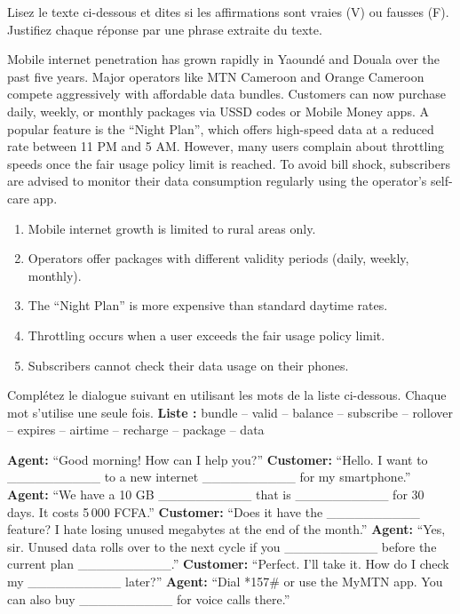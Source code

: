 \documentclass[11pt]{article}
\newcommand{\cle}[1]{{\popxbold\color{popdark}#1}}
\begin{document}
\begin{exercice}
Lisez le texte ci-dessous et dites si les affirmations sont vraies (V) ou fausses (F). Justifiez chaque réponse par une phrase extraite du texte.

\begin{textebox}
Mobile internet penetration has grown rapidly in Yaoundé and Douala over the past five years. Major operators like MTN Cameroon and Orange Cameroon compete aggressively with affordable data bundles. Customers can now purchase daily, weekly, or monthly packages via USSD codes or Mobile Money apps. A popular feature is the “Night Plan”, which offers high-speed data at a reduced rate between 11 PM and 5 AM. However, many users complain about \cle{throttling} speeds once the \cle{fair usage policy} limit is reached. To avoid bill shock, subscribers are advised to monitor their \cle{data consumption} regularly using the operator's self-care app.
\end{textebox}

\begin{enumerate}
    \item Mobile internet growth is limited to rural areas only.
    \item Operators offer packages with different validity periods (daily, weekly, monthly).
    \item The “Night Plan” is more expensive than standard daytime rates.
    \item \cle{Throttling} occurs when a user exceeds the fair usage policy limit.
    \item Subscribers cannot check their data usage on their phones.
\end{enumerate}
\end{exercice}

\begin{exercice}
Complétez le dialogue suivant en utilisant les mots de la liste ci-dessous. Chaque mot s'utilise une seule fois.
\medskip
\noindent \textbf{Liste :} \cle{bundle} -- \cle{valid} -- \cle{balance} -- \cle{subscribe} -- \cle{rollover} -- \cle{expires} -- \cle{airtime} -- \cle{recharge} -- \cle{package} -- \cle{data}

\begin{textebox}
\textbf{Agent:} “Good morning! How can I help you?”
\textbf{Customer:} “Hello. I want to \_\_\_\_\_\_\_\_\_\_ to a new internet \_\_\_\_\_\_\_\_\_\_ for my smartphone.”
\textbf{Agent:} “We have a 10 GB \_\_\_\_\_\_\_\_\_\_ that is \_\_\_\_\_\_\_\_\_\_ for 30 days. It costs 5\,000 FCFA.”
\textbf{Customer:} “Does it have the \_\_\_\_\_\_\_\_\_\_ feature? I hate losing unused megabytes at the end of the month.”
\textbf{Agent:} “Yes, sir. Unused data rolls over to the next cycle if you \_\_\_\_\_\_\_\_\_\_ before the current plan \_\_\_\_\_\_\_\_\_\_.”
\textbf{Customer:} “Perfect. I'll take it. How do I check my \_\_\_\_\_\_\_\_\_\_ later?”
\textbf{Agent:} “Dial *157\# or use the MyMTN app. You can also buy \_\_\_\_\_\_\_\_\_\_ for voice calls there.”
\end{textebox}
\end{exercice}
\end{document}
